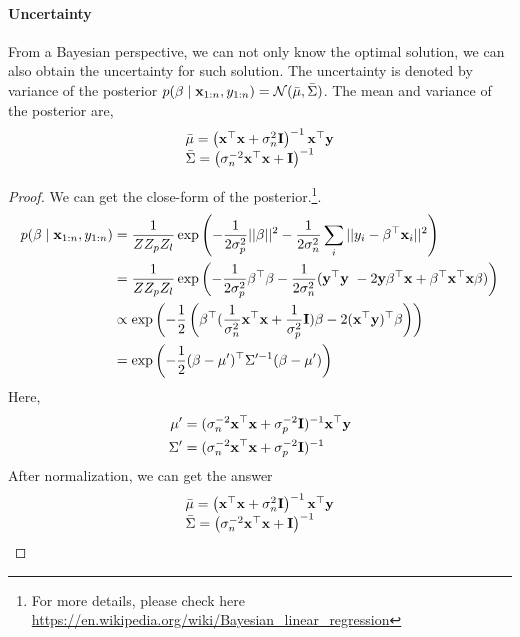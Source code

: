 \paragraph{Uncertainty}
	From a Bayesian perspective, we can not only know the optimal solution, we can also obtain the uncertainty for such solution. The uncertainty is denoted by variance of the posterior $p(\beta \mid \mathbf{x}_{1:n}, y_{1:n}) = \mathcal{N}(\bar{\mu}, \bar{\Sigma})$. The mean and variance of the posterior are,
\begin{equation}
\begin{array}{l}
\bar{\mu}=\left(\mathbf{x}^{\top} \mathbf{x}+\sigma_{n}^{2} \mathbf{I}\right)^{-1} \mathbf{x}^{\top} \mathbf{y} \\
\bar{\Sigma}=\left(\sigma_{n}^{-2} \mathbf{x}^\top \mathbf{x}+\mathbf{I}\right)^{-1}
\end{array}
\end{equation}
\begin{proof} 
We can get the close-form of the posterior.\footnote{For more details, please check here \url{https://en.wikipedia.org/wiki/Bayesian_linear_regression}}.
\begin{equation}
	\begin{aligned}
		p(\beta\mid \mathbf{x}_{1:n}, y_{1:n}) & = \frac{1}{Z Z_p Z_l} \exp \left( -\frac{1}{2\sigma_p^2} || \beta ||^2 -\frac{1}{2\sigma_n^2} \sum_i || y_{i} - \beta^\top \mathbf{x}_{i} ||^2 \right) \\
		& = \frac{1}{Z Z_p Z_l} \exp \left( -\frac{1}{2\sigma_p^2}\beta^\top \beta -\frac{1}{2\sigma_n^2}(\mathbf{y}^\top \mathbf{y}\ - 2 \mathbf{y} \beta^\top \mathbf{x} + \beta^\top \mathbf{x}^\top \mathbf{x} \beta) \right) \\
		& \propto \exp \left( -\frac{1}{2} \left( \beta^\top (\frac{1}{\sigma_n^2} \mathbf{x}^\top \mathbf{x} + \frac{1}{\sigma_p^2} \mathbf{I} ) \beta -2(\mathbf{x}^\top \mathbf{y})^\top \beta \right) \right) \\
		& = \exp \left( -\frac{1}{2}(\beta - {{\mu}}')^\top {{\Sigma}}'^{-1} (\beta - {{\mu}}') \right)
	\end{aligned}
\end{equation}
Here, 
\begin{equation}
	\begin{aligned}
		{{\mu}}' & = (\sigma_n^{-2} \mathbf{x}^\top \mathbf{x} + \sigma_p^{-2} \mathbf{I} )^{-1} \mathbf{x}^\top \mathbf{y} \\
		{{\Sigma}}' & = (\sigma_n^{-2} \mathbf{x}^\top \mathbf{x} + \sigma_p^{-2}\mathbf{I} )^{-1}
	\end{aligned}
\end{equation}
After normalization, we can get the answer
\begin{equation}
\begin{array}{l}
\bar{{\mu}}=\left(\mathbf{x}^{\top} \mathbf{x}+\sigma_{n}^{2} \mathbf{I}\right)^{-1} \mathbf{x}^{\top} \mathbf{y} \\
\bar{{\Sigma}}=\left(\sigma_{n}^{-2} \mathbf{x}^\top \mathbf{x}+\mathbf{I}\right)^{-1}
\end{array}
\end{equation}
\end{proof}

